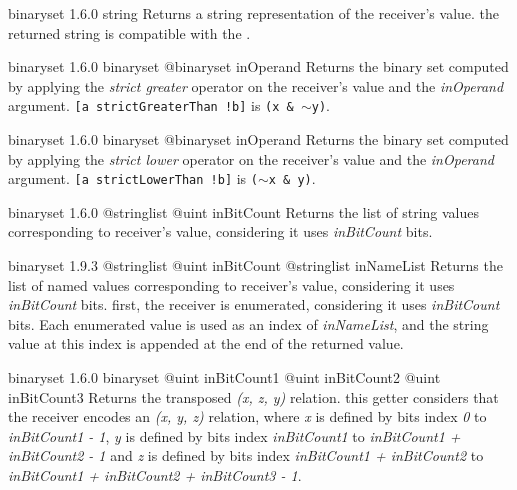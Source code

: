 {binaryset}
{1.6.0}
{string}
{Returns a string representation of the receiver's value.}
{the returned string is compatible with the .}







{binaryset}
{1.6.0}
{binaryset}
{@binaryset inOperand}
{Returns the binary set computed by applying the \emph{strict greater} operator on the receiver's value and the \emph{inOperand} argument.}
{\texttt{[a strictGreaterThan !b]} is \texttt{(x \& $\sim$y)}.}







{binaryset}
{1.6.0}
{binaryset}
{@binaryset inOperand}
{Returns the binary set computed by applying the \emph{strict lower} operator on the receiver's value and the \emph{inOperand} argument.}
{\texttt{[a strictLowerThan !b]} is \texttt{($\sim$x \& y)}.}







{binaryset}
{1.6.0}
{@stringlist}
{@uint inBitCount}
{Returns the list of string values corresponding to receiver's value, considering it uses \emph{inBitCount} bits.}
{}







{binaryset}
{1.9.3}
{@stringlist}
{@uint inBitCount}
{@stringlist inNameList}
{Returns the list of named values corresponding to receiver's value, considering it uses \emph{inBitCount} bits.}
{first, the receiver is enumerated, considering it uses \emph{inBitCount} bits. Each enumerated value is used as an index of \emph{inNameList}, and the string value at this index is appended at the end of the returned value.}







{binaryset}
{1.6.0}
{binaryset}
{@uint inBitCount1}
{@uint inBitCount2}
{@uint inBitCount3}
{Returns the transposed \emph{(x, z, y)} relation.}
{this getter considers that the receiver encodes an \emph{(x, y, z)} relation, where \emph{x} is defined by bits index \emph{0} to \emph{inBitCount1  - 1}, \emph{y} is defined by bits index \emph{inBitCount1} to \emph{inBitCount1 + inBitCount2 - 1} and  \emph{z} is defined by bits index \emph{inBitCount1 + inBitCount2} to \emph{inBitCount1 + inBitCount2 + inBitCount3 - 1}.}







